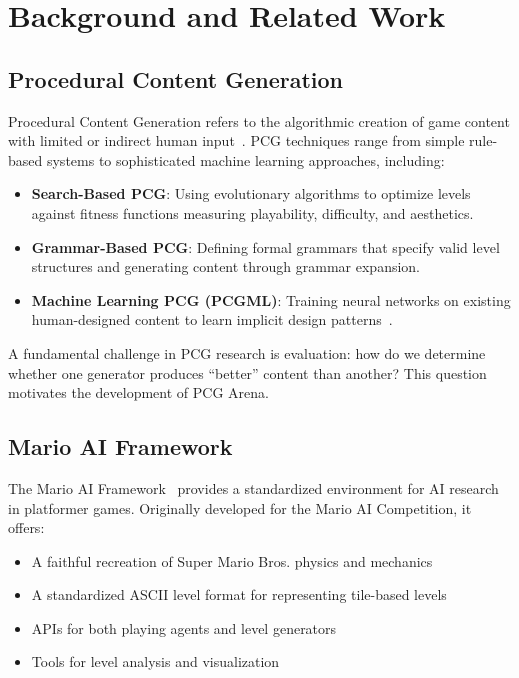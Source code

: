 \documentclass[11pt,a4paper]{article}
\theoremstyle{plain}
\theoremstyle{definition}
\theoremstyle{remark}
\begin{document}
\section{Background and Related Work}
\label{sec:background}

\subsection{Procedural Content Generation}
\label{subsec:pcg}

Procedural Content Generation refers to the algorithmic creation of game content with limited or indirect human input~\cite{summerville2018}. PCG techniques range from simple rule-based systems to sophisticated machine learning approaches, including:

\begin{itemize}
    \item \textbf{Search-Based PCG}: Using evolutionary algorithms to optimize levels against fitness functions measuring playability, difficulty, and aesthetics.
    \item \textbf{Grammar-Based PCG}: Defining formal grammars that specify valid level structures and generating content through grammar expansion.
    \item \textbf{Machine Learning PCG (PCGML)}: Training neural networks on existing human-designed content to learn implicit design patterns~\cite{summerville2018}.
\end{itemize}

A fundamental challenge in PCG research is evaluation: how do we determine whether one generator produces ``better'' content than another? This question motivates the development of PCG Arena.

\subsection{Mario AI Framework}
\label{subsec:mario-ai}

The Mario AI Framework~\cite{marioai} provides a standardized environment for AI research in platformer games. Originally developed for the Mario AI Competition, it offers:

\begin{itemize}
    \item A faithful recreation of Super Mario Bros. physics and mechanics
    \item A standardized ASCII level format for representing tile-based levels
    \item APIs for both playing agents and level generators
    \item Tools for level analysis and visualization
\end{itemize}
\end{document}
